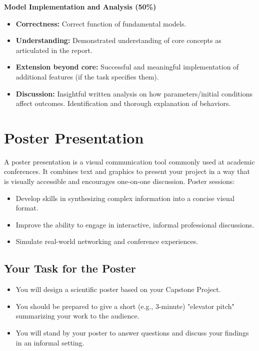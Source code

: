 \documentclass{article}
\begin{document}
\textbf{Model Implementation and Analysis (50\%)}
{ %
\begin{itemize}
    \item \textbf{Correctness:} Correct function of fundamental models.
    \item \textbf{Understanding:} Demonstrated understanding of core concepts as articulated in the report.
    \item \textbf{Extension beyond core:} Successful and meaningful implementation of additional features (if the task specifies them).
    \item \textbf{Discussion:} Insightful written analysis on how parameters/initial conditions affect outcomes. Identification and thorough explanation of behaviors.
\end{itemize}
}

\section{Poster Presentation}
A poster presentation is a visual communication tool commonly used at academic conferences. It combines text and graphics to present your project in a way that is visually accessible and encourages one-on-one discussion. Poster sessions:
\begin{itemize}
    \item Develop skills in synthesizing complex information into a concise visual format.
    \item Improve the ability to engage in interactive, informal professional discussions.
    \item Simulate real-world networking and conference experiences.
\end{itemize}

\subsection{Your Task for the Poster}
\begin{itemize}
    \item You will design a scientific poster based on your Capstone Project.
    \item You should be prepared to give a short (e.g., 3-minute) "elevator pitch" summarizing your work to the audience.
    \item You will stand by your poster to answer questions and discuss your findings in an informal setting.
\end{itemize}
\end{document}
